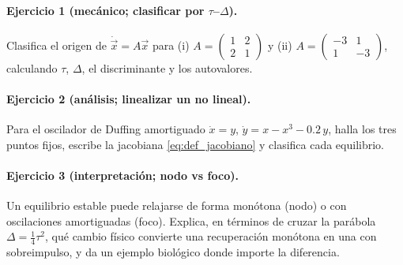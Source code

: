 \paragraph{Ejercicio 1 (mecánico; clasificar por $\tau$--$\Delta$).} Clasifica el origen de $\dot{\vec{x}}=A\vec{x}$ para (i) $A=\begin{pmatrix}1&2\\2&1\end{pmatrix}$ y (ii) $A=\begin{pmatrix}-3&1\\1&-3\end{pmatrix}$, calculando $\tau$, $\Delta$, el discriminante y los autovalores.

\paragraph{Ejercicio 2 (análisis; linealizar un no lineal).} Para el oscilador de Duffing amortiguado $\dot{x}=y$, $\dot{y}=x-x^3-0.2\,y$, halla los tres puntos fijos, escribe la jacobiana \eqref{eq:def_jacobiano} y clasifica cada equilibrio.

\paragraph{Ejercicio 3 (interpretación; nodo vs foco).} Un equilibrio estable puede relajarse de forma monótona (nodo) o con oscilaciones amortiguadas (foco). Explica, en términos de cruzar la parábola $\Delta=\tfrac14\tau^2$, qué cambio físico convierte una recuperación monótona en una con sobreimpulso, y da un ejemplo biológico donde importe la diferencia.
